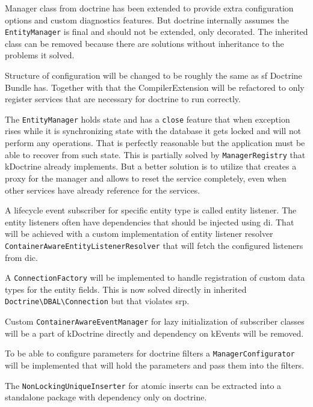 Manager class from \gls{doctrine} has been extended to provide extra configuration options and custom diagnostics features. But \gls{doctrine} internally assumes the \lstinline{EntityManager} is final and should not be extended, only decorated. The inherited class can be removed because there are solutions without inheritance to the problems it solved.

Structure of configuration will be changed to be roughly the same as \gls{sf} Doctrine Bundle has. Together with that the CompilerExtension will be refactored to only register services that are necessary for \gls{doctrine} to run correctly.

The \lstinline{EntityManager} holds state and has a \lstinline{close} feature that when exception rises while it is synchronizing state with the database it gets locked and will not perform any operations. That is perfectly reasonable but the application must be able to recover from such state. This is partially solved by \lstinline{ManagerRegistry} that \gls{kDoctrine} already implements. But a better solution is to utilize  that creates a proxy for the manager and allows to reset the service completely, even when other services have already reference for the services.

A lifecycle event subscriber for specific entity type is called entity listener. The entity listeners often have dependencies that should be injected using \gls{di}. That will be achieved with a custom implementation of entity listener resolver \lstinline{ContainerAwareEntityListenerResolver} that will fetch the configured listeners from \gls{dic}.

A \lstinline{ConnectionFactory} will be implemented to handle registration of custom data types for the entity fields. This is now solved directly in inherited \lstinline{Doctrine\DBAL\Connection} but that violates \gls{srp}.

Custom \lstinline{ContainerAwareEventManager} for lazy initialization of subscriber classes will be a part of \gls{kDoctrine} directly and dependency on \gls{kEvents} will be removed.

To be able to configure parameters for \gls{doctrine} filters a \lstinline{ManagerConfigurator} will be implemented that will hold the parameters and pass them into the filters.

The \lstinline{NonLockingUniqueInserter} for atomic inserts can be extracted into a standalone package with dependency only on \gls{doctrine}.

